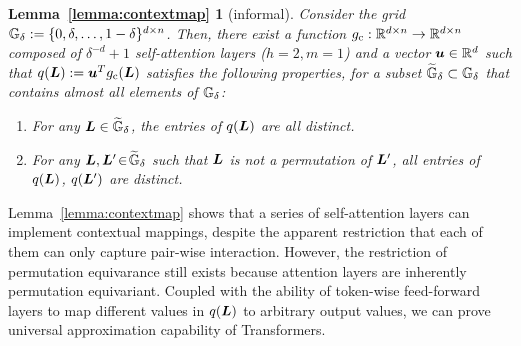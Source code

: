 \newtheorem*{lem-contextmap-sketch}{Lemma~\ref{lemma:contextmap}}

\begin{lem-contextmap-sketch}[informal]
Consider the grid ${\mathbb{G}}_{\delta} := \{0, \delta, \dots, 1-\delta\}^{d \times n}$. Then, there exist a function $g_{\rm c}: \mathbb{R}^{d \times n} \to \mathbb{R}^{d \times n}$ composed of $\delta^{-d} + 1$ self-attention layers \textup{($h = 2, m = 1$)} and a vector ${\bm{u}} \in \mathbb{R}^d$ such that $q({\bm{L}}) := {\bm{u}}^T g_{\rm c}({\bm{L}})$ satisfies the following properties, for a subset $\widetilde{{\mathbb{G}}}_{\delta} \subset {\mathbb{G}}_{\delta}$ that contains almost all elements of ${\mathbb{G}}_{\delta}$:
\begin{enumerate}[\hspace{5pt}1.]
\setlength{\itemsep}{-3pt}
    \item For any ${\bm{L}} \in \widetilde{{\mathbb{G}}}_{\delta}$, the entries of $q({\bm{L}})$ are all distinct.
    \item For any ${\bm{L}}, {\bm{L}}' \!\in\! \widetilde{{\mathbb{G}}}_{\delta}$ such that ${\bm{L}}$ is not a permutation of ${\bm{L}}'$, all entries of $q({\bm{L}})$, $q({\bm{L}}')$ are distinct.
\end{enumerate}
\end{lem-contextmap-sketch}

Lemma~\ref{lemma:contextmap} shows that a series of self-attention layers can implement contextual mappings, despite the apparent restriction that each of them can only capture pair-wise interaction. However, the restriction of permutation equivarance still exists because attention layers are inherently permutation equivariant. Coupled with the ability of token-wise feed-forward layers to map different values in $q({\bm{L}})$ to arbitrary output values, we can prove universal approximation capability of Transformers.



